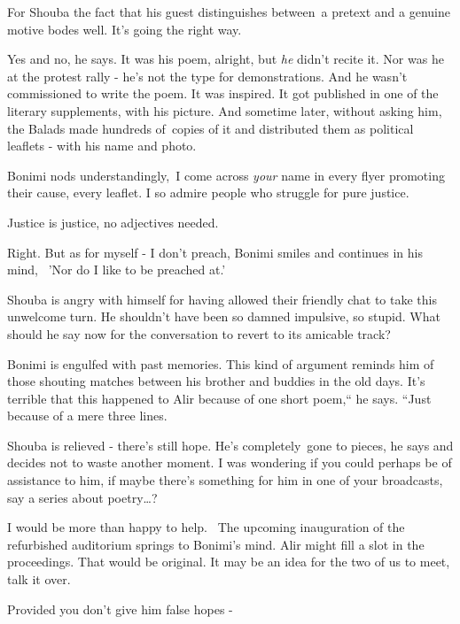 \documentclass[letterpaper]{article}
\begin{document}
For Shouba the fact that his guest distinguishes between~a pretext and a genuine motive bodes well. It's going the right
way. 

{\textquotedbl}Yes and no,{\textquotedbl} he says. {\textquotedbl}It was his poem, alright, but \textit{he} didn't
recite it. Nor was he at the protest rally - he's not the type for demonstrations. And he wasn't commissioned to write
the poem. It was inspired. It got published in one of the literary supplements, with his picture. And sometime later,
without asking him, the Balads made hundreds of~copies of it and distributed them as political leaflets - with his name
and photo.{\textquotedbl} 

Bonimi nods understandingly,~{\textquotedbl}I come across \textit{your }name in every flyer promoting their cause, every
leaflet. I so admire people who struggle for pure justice.{\textquotedbl}

{\textquotedbl}Justice is justice, no adjectives needed.{\textquotedbl}

{\textquotedbl}Right. But as for myself - I don't preach,{\textquotedbl} Bonimi smiles and continues in his mind,
\ {}'Nor do I like to be preached at.'

Shouba is angry with himself for having allowed their friendly chat to take this unwelcome turn. He shouldn't have been
so damned impulsive, so stupid. What should he say now for the conversation to revert to its amicable track?

Bonimi is engulfed with past memories. This kind of argument reminds him of those shouting matches between his brother
and buddies in the old days. It's terrible that this happened to Alir because of one short poem,`` he says. ``Just
because of{ }{a }mere three lines.{\textquotedbl}{\textquotedbl}

Shouba is relieved - there's still hope. {\textquotedbl}He's completely~gone to pieces,{\textquotedbl} he says and
decides not to waste another moment. {\textquotedbl}I was wondering if you could perhaps be of assistance to him, if
maybe there's something for him in one of your broadcasts, say a series about poetry{\dots}?{\textquotedbl}

{\textquotedbl}I would be more than happy to help.{\textquotedbl} \ The upcoming inauguration of the refurbished
auditorium springs to Bonimi's mind. Alir might fill a slot in the proceedings. That would be original.
{\textquotedbl}It may be an idea for the two of us to meet, talk it over.{\textquotedbl}

{\textquotedbl}Provided you don't give him false hopes -{\textquotedbl}
\end{document}
